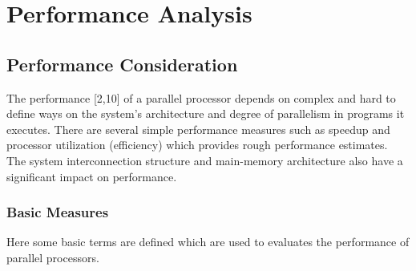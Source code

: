 \chapter{Performance Analysis}

\section{Performance Consideration}
The performance [2,10] of a parallel processor depends on complex and hard to define ways on the system's architecture and degree of parallelism in programs
it executes. There are several simple performance measures such as speedup and processor utilization (efficiency) which provides rough performance estimates.
The system interconnection structure and main-memory architecture also have a significant impact on performance. 

\subsection{Basic Measures}
	Here some basic terms are defined which are used to evaluates the performance of parallel processors. 

